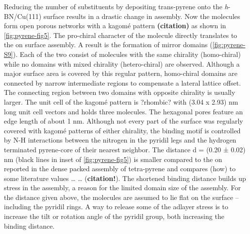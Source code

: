 Reducing the number of substituents by depositing trans-pyrene onto the \textit{h}-BN/Cu(111) surface results in a drastic change in assembly. Now the molecules form open porous networks with a kagom\'e pattern \textbf{(citation)} as shown in \autoref{fig:pyrene-fig5}. The pro-chiral character of the molecule directly translates to the on surface assembly. A result is the formation of mirror domains (\autoref{fig:pyrene-S9}). Each of the two consist of molecules with the same chirality (homo-chiral) while no domains with mixed chirality (hetero-chiral) are observed. Although a major surface area is covered by this regular pattern, homo-chiral domains are connected by narrow intermediate regions to compensate a lateral lattice offset. The connecting region between two domains with opposite chirality is usually larger. The unit cell of the kagom\'e pattern is ?rhombic? with (3.04 x 2.93) nm long unit cell vectors and holds three molecules. The hexagonal pores feature an edge length of about 1 nm. Although not every part of the surface was regularly covered with kagom\'e patterns of either chirality, the binding motif is controlled by N-H interactions between the nitrogen in the pyridil legs and the hydrogen terminated pyrene-core of their nearest neighbor. The distance d = (0.20 ± 0.02) nm (black lines in inset of \autoref{fig:pyrene-fig5}) is smaller compared to the on reported in the dense packed assembly of tetra-pyrene and compares (how) to some literature values … … (\textbf{citation!}). The shortened binding distance builds up stress in the assembly, a reason for the limited domain size of the assembly. For the distance given above, the molecules are assumed to lie flat on the surface – including the pyridil rings. A way to release some of the adlayer stress is to increase the tilt or rotation angle of the pyridil group, both increasing the binding distance.


